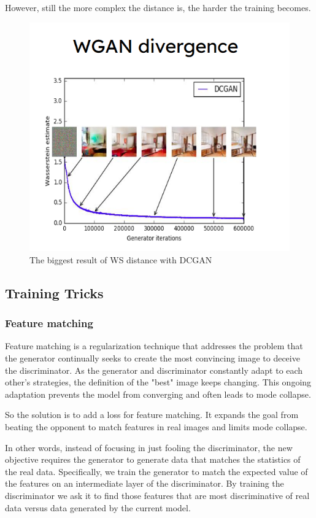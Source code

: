 However, still the more complex the distance is, the harder the training becomes. 

\begin{figure}[H]
    \centering
    \includegraphics[width=0.75\linewidth]{tikz/WS quality.png}
    \caption{The biggest result of WS distance with DCGAN}
    \label{fig:WS-quality}
\end{figure}



\subsection{Training Tricks}

\subsubsection{Feature matching}

Feature matching is a  regularization technique that addresses the problem that the generator continually seeks to create the most convincing image to deceive the discriminator. As the generator and discriminator constantly adapt to each other’s strategies, the definition of the "best" image keeps changing. This ongoing adaptation prevents the model from converging and often leads to mode collapse.

So the solution is to add a loss for feature matching. It expands the goal from beating the opponent to match features in real images and limits mode collapse.

In other words, instead of focusing in just fooling the discriminator, the new objective requires the generator to generate data that matches the statistics of the real data.  Specifically, we train the generator to match the expected value of the features on an intermediate layer of the discriminator. By training the discriminator we ask it to find those features that are most discriminative of real data versus data generated by the current model.

